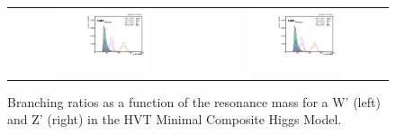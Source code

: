 \begin{figure}[t]
  \centering
  \begin{tabular}{cc}
    \includegraphics[width=0.5\textwidth]{Figures/MC_N1/pt_j0.pdf} &
    \includegraphics[width=0.5\textwidth]{Figures/MC_N1/pt_j0.pdf} \\
  \end{tabular}
  \caption{Branching ratios as a function of the resonance mass for a W' (left) and Z' (right) in the HVT Minimal Composite Higgs Model.}
  \label{fig:hvt_brs}
\end{figure}
